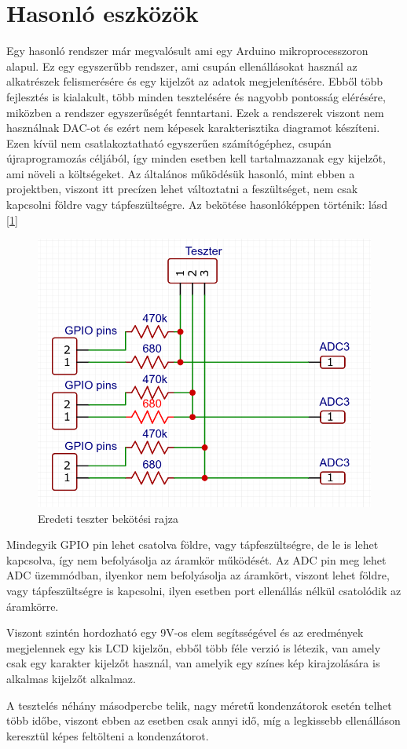\section{Hasonló eszközök}

Egy hasonló rendszer már megvalósult \cite{similarSystem} ami egy Arduino\cite{ArduinoAtmega} 
mikroprocesszoron alapul. Ez egy egyszerűbb rendszer, ami csupán ellenállásokat használ az 
alkatrészek felismerésére és egy kijelzőt az adatok megjelenítésére. Ebből több fejlesztés is 
kialakult, több minden tesztelésére és nagyobb pontosság elérésére, miközben a rendszer 
egyszerűségét fenntartani. Ezek a rendszerek viszont nem használnak DAC-ot és ezért nem képesek 
karakterisztika diagramot készíteni. Ezen kívül nem csatlakoztatható egyszerűen számítógéphez, 
csupán újraprogramozás céljából, így minden esetben kell tartalmazzanak egy kijelzőt, ami 
növeli a költségeket. Az általános működésük hasonló, mint ebben a projektben, viszont itt 
precízen lehet változtatni a feszültséget, nem csak kapcsolni földre vagy tápfeszültségre.
Az bekötése hasonlóképpen történik: lásd [\ref{fig:basicTesterConnection}]

\begin{figure}[h]
    \centering
    \includegraphics[scale=0.3]{figures/images/literature/OrgTesterConnection.png}
    \caption{Eredeti teszter bekötési rajza}
    \label{fig:basicTesterConnection}
\end{figure}

Mindegyik GPIO pin lehet csatolva földre, vagy tápfeszültségre, de le is lehet kapcsolva, így 
nem befolyásolja az áramkör működését. Az ADC pin meg lehet ADC üzemmódban, ilyenkor nem befolyásolja
az áramkört, viszont lehet földre, vagy tápfeszültségre is kapcsolni, ilyen esetben port ellenállás
nélkül csatolódik az áramkörre.

Viszont szintén hordozható egy 9V-os elem segítsségével és az eredmények megjelennek egy
kis LCD kijelzőn, ebből több féle verzió is létezik, van amely csak egy karakter kijelzőt
használ, van amelyik egy színes kép kirajzolására is alkalmas kijelzőt alkalmaz. 

A tesztelés néhány másodpercbe telik, nagy méretű kondenzátorok esetén telhet több időbe,
viszont ebben az esetben csak annyi idő, míg a legkissebb ellenálláson keresztül képes feltölteni
a kondenzátorot.
